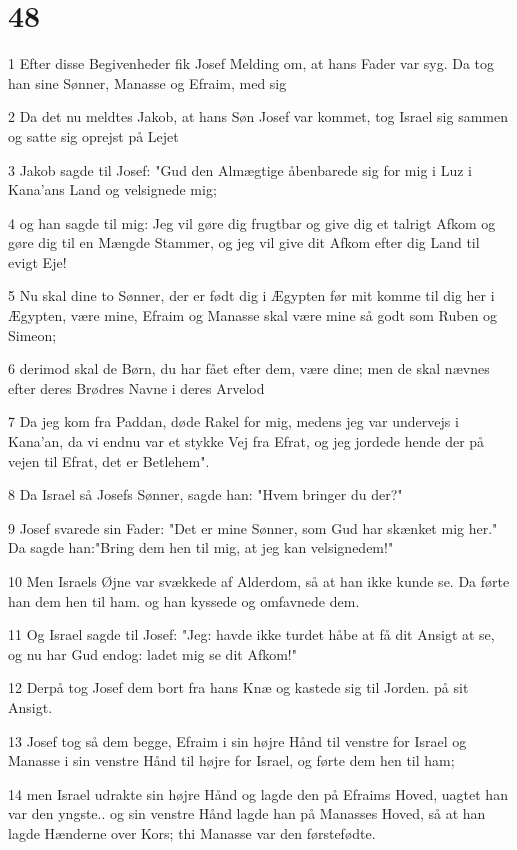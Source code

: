 \chapter{48}

\par 1 Efter disse Begivenheder fik Josef Melding om, at hans Fader var syg. Da tog han sine Sønner, Manasse og Efraim, med sig
\par 2 Da det nu meldtes Jakob, at hans Søn Josef var kommet, tog Israel sig sammen og satte sig oprejst på Lejet
\par 3 Jakob sagde til Josef: "Gud den Almægtige åbenbarede sig for mig i Luz i Kana'ans Land og velsignede mig;
\par 4 og han sagde til mig: Jeg vil gøre dig frugtbar og give dig et talrigt Afkom og gøre dig til en Mængde Stammer, og jeg vil give dit Afkom efter dig Land til evigt Eje!
\par 5 Nu skal dine to Sønner, der er født dig i Ægypten før mit komme til dig her i Ægypten, være mine, Efraim og Manasse skal være mine så godt som Ruben og Simeon;
\par 6 derimod skal de Børn, du har fået efter dem, være dine; men de skal nævnes efter deres Brødres Navne i deres Arvelod
\par 7 Da jeg kom fra Paddan, døde Rakel for mig, medens jeg var undervejs i Kana'an, da vi endnu var et stykke Vej fra Efrat, og jeg jordede hende der på vejen til Efrat, det er Betlehem".
\par 8 Da Israel så Josefs Sønner, sagde han: "Hvem bringer du der?"
\par 9 Josef svarede sin Fader: "Det er mine Sønner, som Gud har skænket mig her." Da sagde han:"Bring dem hen til mig, at jeg kan velsignedem!"
\par 10 Men Israels Øjne var svækkede af Alderdom, så at han ikke kunde se. Da førte han dem hen til ham. og han kyssede og omfavnede dem.
\par 11 Og Israel sagde til Josef: "Jeg: havde ikke turdet håbe at få dit Ansigt at se, og nu har Gud endog: ladet mig se dit Afkom!"
\par 12 Derpå tog Josef dem bort fra hans Knæ og kastede sig til Jorden. på sit Ansigt.
\par 13 Josef tog så dem begge, Efraim i sin højre Hånd til venstre for Israel og Manasse i sin venstre Hånd til højre for Israel, og førte dem hen til ham;
\par 14 men Israel udrakte sin højre Hånd og lagde den på Efraims Hoved, uagtet han var den yngste.. og sin venstre Hånd lagde han på Manasses Hoved, så at han lagde Hænderne over Kors; thi Manasse var den førstefødte.
